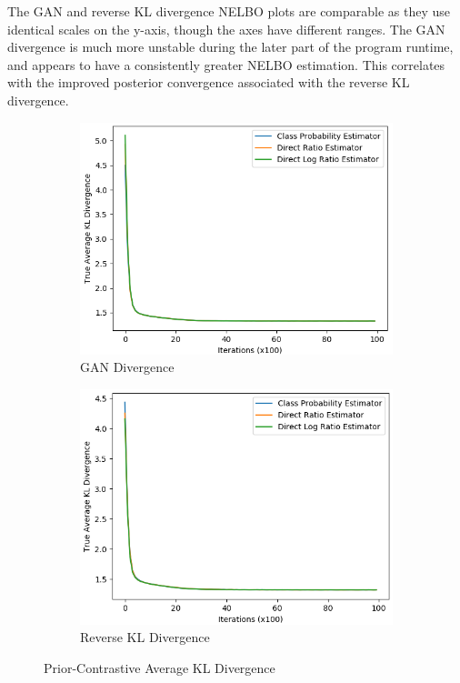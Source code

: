 \documentclass[honours,12pt]{unswthesis}
\numberwithin{equation}{section}
\theoremstyle{definition}
\begin{document}
The GAN and reverse KL divergence NELBO plots are comparable as they use identical scales on the y-axis, though the axes have different ranges. The GAN divergence is much more unstable during the later part of the program runtime, and appears to have a consistently greater NELBO estimation. This correlates with the improved posterior convergence associated with the reverse KL divergence.
\newpage
\begin{figure}
\begin{subfigure}{0.49\textwidth}
\includegraphics[width=\linewidth]{truklmins/PCADVvsPCADVexpvsPCADVgudlog.png}
\caption{GAN Divergence}
\end{subfigure}
\begin{subfigure}{0.49\textwidth}
\includegraphics[width=\linewidth]{truklmins/PCKLDvsPCKLexpvsPCKLgudlog.png}
\caption{Reverse KL Divergence}
\end{subfigure}
\caption{Prior-Contrastive Average KL Divergence}
\end{figure}
\end{document}
